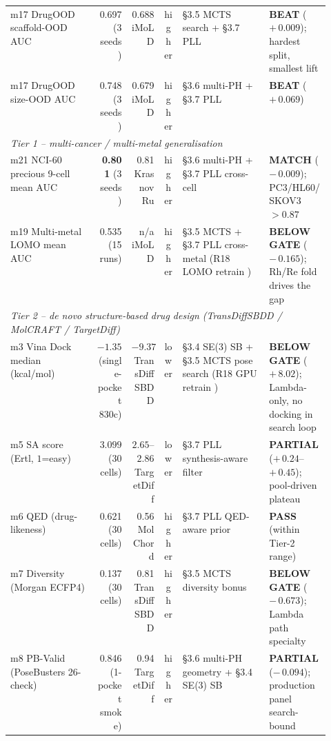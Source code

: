 \begin{table}[ht]
\begin{tabular}{p{0.27\linewidth} r r c p{0.27\linewidth} l}
m17 DrugOOD scaffold-OOD AUC
  & 0.697 \MEASURED{} (3 seeds)
  & 0.688 iMoLD \CITEDONLY{}
  & higher
  & \S{}3.5 MCTS search + \S{}3.7 PLL
  & \textbf{BEAT} ($+\,0.009$); hardest split, smallest lift \\
m17 DrugOOD size-OOD AUC
  & 0.748 \MEASURED{} (3 seeds)
  & 0.679 iMoLD \CITEDONLY{}
  & higher
  & \S{}3.6 multi-PH + \S{}3.7 PLL
  & \textbf{BEAT} ($+\,0.069$) \\
\midrule
\multicolumn{6}{l}{\textit{Tier 1 -- multi-cancer / multi-metal generalisation}} \\
m21 NCI-60 precious 9-cell mean AUC
  & \textbf{0.801} \MEASURED{} (3 seeds)
  & 0.81 Krasnov Ru \CITEDONLY{}
  & higher
  & \S{}3.6 multi-PH + \S{}3.7 PLL cross-cell
  & \textbf{MATCH} ($-\,0.009$); PC3/HL60/SKOV3 $>\!0.87$ \\
m19 Multi-metal LOMO mean AUC
  & 0.535 \MEASURED{} (15 runs)
  & n/a iMoLD \CITEDONLY{}
  & higher
  & \S{}3.5 MCTS + \S{}3.7 PLL cross-metal (R18 LOMO retrain \PROJECTED{})
  & \textbf{BELOW GATE} ($-\,0.165$); Rh/Re fold drives the gap \\
\midrule
\multicolumn{6}{l}{\textit{Tier 2 -- de novo structure-based drug design (TransDiffSBDD / MolCRAFT / TargetDiff)}} \\
m3\;\; Vina Dock median (kcal/mol)
  & $-1.35$ \MEASURED{} (single-pocket 830c)
  & $-9.37$ TransDiffSBDD \CITEDONLY{}
  & lower
  & \S{}3.4 SE(3) SB + \S{}3.5 MCTS pose search (R18 GPU retrain \PROJECTED{})
  & \textbf{BELOW GATE} ($+\,8.02$); Lambda-only, no docking in search loop \\
m5\;\; SA score (Ertl, $1$=easy)
  & $3.099$ \MEASURED{} (30 cells)
  & $2.65$--$2.86$ TargetDiff \CITEDONLY{}
  & lower
  & \S{}3.7 PLL synthesis-aware filter
  & \textbf{PARTIAL} ($+\,0.24$--$+\,0.45$); pool-driven plateau \\
m6\;\; QED (drug-likeness)
  & 0.621 \MEASURED{} (30 cells)
  & 0.56 MolChord \CITEDONLY{}
  & higher
  & \S{}3.7 PLL QED-aware prior
  & \textbf{PASS} (within Tier-2 range) \\
m7\;\; Diversity (Morgan ECFP4)
  & 0.137 \MEASURED{} (30 cells)
  & 0.81 TransDiffSBDD \CITEDONLY{}
  & higher
  & \S{}3.5 MCTS diversity bonus
  & \textbf{BELOW GATE} ($-\,0.673$); Lambda path specialty \\
m8\;\; PB-Valid (PoseBusters 26-check)
  & 0.846 \MEASURED{} (1-pocket smoke)
  & 0.94 TargetDiff \CITEDONLY{}
  & higher
  & \S{}3.6 multi-PH geometry + \S{}3.4 SE(3) SB
  & \textbf{PARTIAL} ($-\,0.094$); production panel search-bound \\

\end{tabular}
\end{table}
